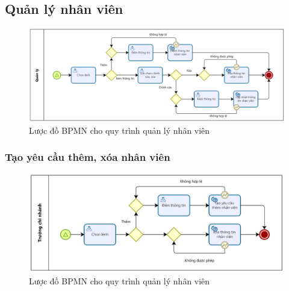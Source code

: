 \subsection{Quản lý nhân viên}
\begin{figure}[!htp]
    \centering
    \includegraphics[width=14cm]{img/BPMN/Hien/Employee_Management.png}
    \newline
    \caption{Lược đồ BPMN cho quy trình quản lý nhân viên}
\end{figure}

\subsubsection*{Tạo yêu cầu thêm, xóa nhân viên}
\begin{figure}[!htp]
    \centering
    \includegraphics[width=14cm]{img/BPMN/Hien/Employee_request.png}
    \newline
    \caption{Lược đồ BPMN cho quy trình quản lý nhân viên}
\end{figure}

